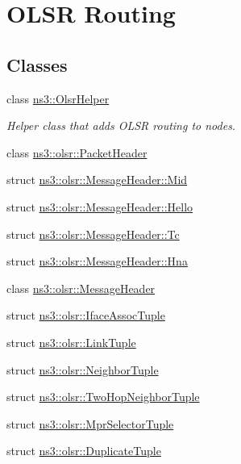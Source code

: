 \hypertarget{group__olsr}{}\section{O\+L\+SR Routing}
\label{group__olsr}
\subsection*{Classes}
\begin{DoxyCompactItemize}
\item 
class \hyperlink{classns3_1_1OlsrHelper}{ns3\+::\+Olsr\+Helper}
\begin{DoxyCompactList}\small\item\em Helper class that adds O\+L\+SR routing to nodes. \end{DoxyCompactList}\item 
class \hyperlink{classns3_1_1olsr_1_1PacketHeader}{ns3\+::olsr\+::\+Packet\+Header}
\item 
struct \hyperlink{structns3_1_1olsr_1_1MessageHeader_1_1Mid}{ns3\+::olsr\+::\+Message\+Header\+::\+Mid}
\item 
struct \hyperlink{structns3_1_1olsr_1_1MessageHeader_1_1Hello}{ns3\+::olsr\+::\+Message\+Header\+::\+Hello}
\item 
struct \hyperlink{structns3_1_1olsr_1_1MessageHeader_1_1Tc}{ns3\+::olsr\+::\+Message\+Header\+::\+Tc}
\item 
struct \hyperlink{structns3_1_1olsr_1_1MessageHeader_1_1Hna}{ns3\+::olsr\+::\+Message\+Header\+::\+Hna}
\item 
class \hyperlink{classns3_1_1olsr_1_1MessageHeader}{ns3\+::olsr\+::\+Message\+Header}
\item 
struct \hyperlink{structns3_1_1olsr_1_1IfaceAssocTuple}{ns3\+::olsr\+::\+Iface\+Assoc\+Tuple}
\item 
struct \hyperlink{structns3_1_1olsr_1_1LinkTuple}{ns3\+::olsr\+::\+Link\+Tuple}
\item 
struct \hyperlink{structns3_1_1olsr_1_1NeighborTuple}{ns3\+::olsr\+::\+Neighbor\+Tuple}
\item 
struct \hyperlink{structns3_1_1olsr_1_1TwoHopNeighborTuple}{ns3\+::olsr\+::\+Two\+Hop\+Neighbor\+Tuple}
\item 
struct \hyperlink{structns3_1_1olsr_1_1MprSelectorTuple}{ns3\+::olsr\+::\+Mpr\+Selector\+Tuple}
\item 
struct \hyperlink{structns3_1_1olsr_1_1DuplicateTuple}{ns3\+::olsr\+::\+Duplicate\+Tuple}
\item 

\end{DoxyCompactItemize}
